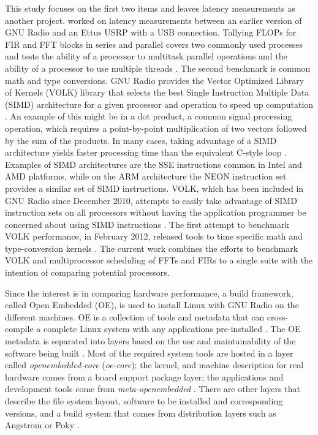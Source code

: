 \documentclass[english]{article}
\begin{document}
This study focuses on the first two items and leaves latency measurements as another project. 
\cite{latency-meas} worked on latency measurements between an earlier version of GNU Radio and an Ettus USRP with a USB connection. 
Tallying FLOPs for FIR and FFT blocks in series and parallel covers two commonly used processes and tests the ability of a processor to multitask parallel operations and the ability of a processor to use multiple threads \cite{gnuradio-mpsched}.
The second benchmark is common math and type conversions. 
GNU Radio provides the Vector Optimized Library of Kernels (VOLK) library that selects the best Single Instruction Multiple Data (SIMD) architecture for a given processor and operation to speed up computation  \cite{trondeau-volk,gnuradio-volk}.
An example of this might be in a dot product, a common signal processing operation, which requires a point-by-point multiplication of two vectors followed by the sum of the products. 
In many cases, taking advantage of a SIMD architecture yields faster processing time than the equivalent C-style loop \cite{trondeau-volk,scalability_simd,vectorprocess_sdr}.
Examples of SIMD architectures are the SSE instructions common in Intel and AMD platforms, while on the ARM architecture the NEON instruction set provides a similar set of SIMD instructions.
VOLK, which has been included in GNU Radio since December 2010, attempts to easily take advantage of SIMD instruction sets on all processors without having the application programmer be concerned about using SIMD instructions \cite{trondeau-volk,trondeau-volkbenchmarking,gnuradio-volk}. 
The first attempt to benchmark VOLK performance, in February 2012, released tools to time specific math and type-conversion kernels \cite{trondeau-volkbenchmarking}. 
The current work combines the efforts to benchmark VOLK and multiprocessor scheduling of FFTs and FIRs to a single suite with the intention of comparing potential processors. 


Since the interest is in comparing hardware performance, a build framework, called Open Embedded (OE), is used to install Linux with GNU Radio on the different machines.
OE is a collection of tools and metadata that can cross-compile a complete Linux system with any applications pre-installed \cite{layer-hierarchy}.
The OE metadata is separated into layers based on the use and maintainability of the software being built \cite{oecore-wiki}.
Most of the required system tools are hosted in a layer called \textit{openembedded-core} (\textit{oe-core}); the kernel, and machine description for real hardware comes from a board support package layer; the applications and development tools come from \textit{meta-openembedded} \cite{oecore-wiki}.
There are other layers that describe the file system layout, software to be installed and corresponding versions, and a build system that comes from distribution layers such as Angstrom or Poky \cite{layer-hierarchy,yocto-dev}.
\end{document}
